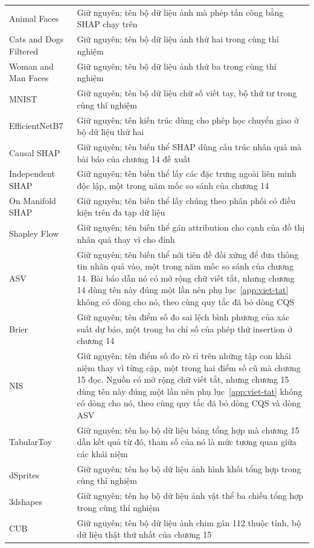 \begin{longtable}{@{}lp{7cm}@{}}
Animal Faces & Giữ nguyên; tên bộ dữ liệu ảnh mà phép tấn công bằng SHAP chạy trên \\
Cats and Dogs Filtered & Giữ nguyên; tên bộ dữ liệu ảnh thứ hai trong cùng thí nghiệm \\
Woman and Man Faces & Giữ nguyên; tên bộ dữ liệu ảnh thứ ba trong cùng thí nghiệm \\
MNIST & Giữ nguyên; tên bộ dữ liệu chữ số viết tay, bộ thứ tư trong cùng thí nghiệm \\
EfficientNetB7 & Giữ nguyên; tên kiến trúc dùng cho phép học chuyển giao ở bộ dữ liệu thứ hai \\
Causal SHAP & Giữ nguyên; tên biến thể SHAP dùng cấu trúc nhân quả mà bài báo của chương 14 đề xuất \\
Independent SHAP & Giữ nguyên; tên biến thể lấy các đặc trưng ngoài liên minh độc lập, một trong năm mốc so sánh của chương 14 \\
On Manifold SHAP & Giữ nguyên; tên biến thể lấy chúng theo phân phối có điều kiện trên đa tạp dữ liệu \\
Shapley Flow & Giữ nguyên; tên biến thể gán attribution cho cạnh của đồ thị nhân quả thay vì cho đỉnh \\
ASV & Giữ nguyên; tên biến thể nới tiên đề đối xứng để đưa thông tin nhân quả vào, một trong năm mốc so sánh của chương 14. Bài báo dẫn nó có mở rộng chữ viết tắt, nhưng chương 14 dùng tên này đúng một lần nên phụ lục~\ref{app:viet-tat} không có dòng cho nó, theo cùng quy tắc đã bỏ dòng CQS \\
Brier & Giữ nguyên; tên điểm số đo sai lệch bình phương của xác suất dự báo, một trong ba chỉ số của phép thử insertion ở chương 14 \\
NIS & Giữ nguyên; tên điểm số đo rò rỉ trên những tập con khái niệm thay vì từng cặp, một trong hai điểm số cũ mà chương 15 đọc. Nguồn có mở rộng chữ viết tắt, nhưng chương 15 dùng tên này đúng một lần nên phụ lục~\ref{app:viet-tat} không có dòng cho nó, theo cùng quy tắc đã bỏ dòng CQS và dòng ASV \\
TabularToy & Giữ nguyên; tên họ bộ dữ liệu bảng tổng hợp mà chương 15 dẫn kết quả từ đó, tham số của nó là mức tương quan giữa các khái niệm \\
dSprites & Giữ nguyên; tên họ bộ dữ liệu ảnh hình khối tổng hợp trong cùng thí nghiệm \\
3dshapes & Giữ nguyên; tên họ bộ dữ liệu ảnh vật thể ba chiều tổng hợp trong cùng thí nghiệm \\
CUB & Giữ nguyên; tên bộ dữ liệu ảnh chim gán 112 thuộc tính, bộ dữ liệu thật thứ nhất của chương 15 \\

\end{longtable}
